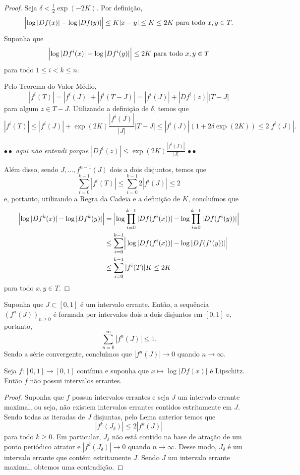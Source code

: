 \begin{definition}
\begin{proof}
Seja $\delta < \frac{1}{2} \exp(-2K)$. Por definição,
$$\Bigl|\log |Df(x)| - \log |Df(y)|\Bigr| \leq K|x-y| \leq K \leq 2K \textrm{ para todo } x, y \in T.$$
Suponha que
$$\Bigl|\log |Df^i(x)| - \log |Df^i(y)|\Bigr| \leq 2K \textrm{ para todo } x, y \in T$$
para todo $1 \leq i < k \leq n$.

Pelo Teorema do Valor Médio,
$$|f^i(T)| = |f^i(J)| + |f^i(T-J)| = |f^i(J)| + |Df^i(z)||T-J|$$
para algum $z \in T - J$. Utilizando a definição de $\delta$, temos que
$$|f^i(T)| \leq |f^i(J)| + \exp(2K)  \frac{|f^i(J)|}{|J|} |T-J| \leq |f^i(J)| (1 + 2 \delta \exp(2K)) \leq 2|f^i(J)|.$$

\textit{$\bullet \bullet$ aqui não entendi porque $|Df^i(z)| \leq \exp(2K)  \frac{|f^i(J)|}{|J|}$ $\bullet \bullet$}

Além disso, sendo $J, \dots, f^{n-1}(J)$ dois a dois disjuntos, temos que
$$\sum_{i=0}^{k-1}|f^i(T)| \leq \sum_{i=0}^{k-1} 2 |f^i(J)| \leq 2$$
e, portanto, utilizando a Regra da Cadeia e a definição de $K$, concluímos que
\begin{align*}
\Bigl| \log |Df^k(x)| - \log |Df^k(y)| \Bigr| & = \Bigl| \log \prod_{i=0}^{k-1} |Df(f^i(x))| - \log \prod_{i=0}^{k-1} |Df(f^i(y))| \Bigr| \\
& \leq \sum_{i=0}^{k-1} \Bigr| \log |Df(f^i(x))| - \log |Df(f^i(y))| \Bigr|\\
& \leq \sum_{i=0}^{k-1} | f^i(T) |K \leq 2K
\end{align*}
para todo $x, y \in T$.
\end{proof} 

Suponha que $J \subset [0,1]$ é um intervalo errante. Então, a sequência $(f^n(J))_{n \geq 0}$ é formada por intervalos dois a dois disjuntos em $[0,1]$ e, portanto,
$$\sum_{n=0}^\infty |f^n(J)| \leq 1.$$
Sendo a série convergente, concluímos que $|f^n(J)| \to 0$ quando $n \to \infty$.

\begin{corollary}
Seja $f: [0,1] \to [0,1]$ contínua e suponha que $x \mapsto \log |Df(x)|$ é Lipschitz. Então $f$ não possui intervalos errantes.
\end{corollary}

\begin{proof}
Suponha que $f$ possua intervalos errantes e seja $J$ um intervalo errante maximal, ou seja, não existem intervalos errantes contidos estritamente em $J$. Sendo todas as iteradas de $J$ disjuntas, pelo Lema anterior temos que
$$|f^k(J_\delta)| \leq 2|f^k(J)|$$
para todo $k \geq 0$. Em particular, $J_\delta$ não está contido na base de atração de um ponto periódico atrator e $|f^k(J_\delta)| \to 0$ quando $n \to \infty$. Desse modo, $J_\delta$ é um intervalo errante que contém estritamente $J$. Sendo $J$ um intervalo errante maximal, obtemos uma contradição.
\end{proof}

\end{definition}